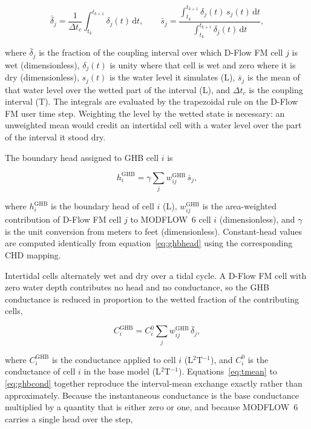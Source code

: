 \documentclass[preprint,authoryear,11pt]{elsarticle}
\begin{document}
\begin{equation}
  \bar{\delta}_{j} = \frac{1}{\Delta t_{c}}
      \int_{t_{k}}^{t_{k+1}} \delta_{j}(t) \, \mathrm{d}t ,
  \qquad
  \bar{s}_{j} = \frac{\int_{t_{k}}^{t_{k+1}} \delta_{j}(t) \, s_{j}(t) \,
      \mathrm{d}t}{\int_{t_{k}}^{t_{k+1}} \delta_{j}(t) \, \mathrm{d}t} ,
  \label{eq:tmean}
\end{equation}

\noindent where $\bar{\delta}_{j}$ is the fraction of the coupling interval over which D-Flow FM cell $j$ is wet (dimensionless), $\delta_{j}(t)$ is unity where that cell is wet and zero where it is dry (dimensionless), $s_{j}(t)$ is the water level it simulates (L), $\bar{s}_{j}$ is the mean of that water level over the wetted part of the interval (L), and $\Delta t_{c}$ is the coupling interval (T). The integrals are evaluated by the trapezoidal rule on the D-Flow FM user time step. Weighting the level by the wetted state is necessary: an unweighted mean would credit an intertidal cell with a water level over the part of the interval it stood dry.

The boundary head assigned to GHB cell $i$ is

\begin{equation}
  h_{i}^{\mathrm{GHB}} = \gamma \sum_{j} w_{ij}^{\mathrm{GHB}} \, \bar{s}_{j} ,
  \label{eq:ghbhead}
\end{equation}

\noindent where $h_{i}^{\mathrm{GHB}}$ is the boundary head of cell $i$ (L), $w_{ij}^{\mathrm{GHB}}$ is the area-weighted contribution of D-Flow FM cell $j$ to MODFLOW~6 cell $i$ (dimensionless), and $\gamma$ is the unit conversion from meters to feet (dimensionless). Constant-head values are computed identically from equation~\ref{eq:ghbhead} using the corresponding CHD mapping.

Intertidal cells alternately wet and dry over a tidal cycle. A D-Flow FM cell with zero water depth contributes no head and no conductance, so the GHB conductance is reduced in proportion to the wetted fraction of the contributing cells,

\begin{equation}
  C_{i}^{\mathrm{GHB}} = C_{i}^{0} \sum_{j} w_{ij}^{\mathrm{GHB}} \,
      \bar{\delta}_{j} ,
  \label{eq:ghbcond}
\end{equation}

\noindent where $C_{i}^{\mathrm{GHB}}$ is the conductance applied to cell $i$ (L$^{2}$T$^{-1}$), and $C_{i}^{0}$ is the conductance of cell $i$ in the base model (L$^{2}$T$^{-1}$). Equations~\ref{eq:tmean} to \ref{eq:ghbcond} together reproduce the interval-mean exchange exactly rather than approximately. Because the instantaneous conductance is the base conductance multiplied by a quantity that is either zero or one, and because MODFLOW~6 carries a single head over the step,
\end{document}
